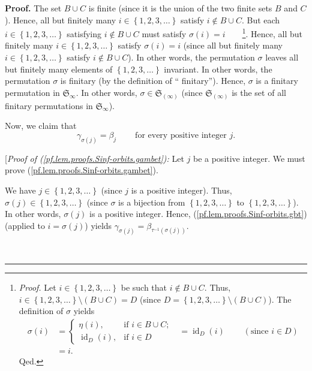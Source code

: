 \documentclass[numbers=enddot,12pt,final,onecolumn,notitlepage]{scrartcl}%
\theoremstyle{definition}
\newenvironment{proof}[1][Proof]{\noindent\textbf{#1.} }{\ \rule{0.5em}{0.5em}}
\newenvironment{verlong}{}{}
\begin{document}
\begin{verlong}
\begin{proof}
The set $B\cup C$ is finite (since it is the union of the two finite sets $B$
and $C$). Hence, all but finitely many $i\in\left\{  1,2,3,\ldots\right\}  $
satisfy $i\notin B\cup C$. But each $i\in\left\{  1,2,3,\ldots\right\}  $
satisfying $i\notin B\cup C$ must satisfy $\sigma\left(  i\right)
=i$\ \ \ \ \footnote{\textit{Proof.} Let $i\in\left\{  1,2,3,\ldots\right\}  $
be such that $i\notin B\cup C$. Thus, $i\in\left\{  1,2,3,\ldots\right\}
\setminus\left(  B\cup C\right)  =D$ (since $D=\left\{  1,2,3,\ldots\right\}
\setminus\left(  B\cup C\right)  $). The definition of $\sigma$ yields
\begin{align*}
\sigma\left(  i\right)   &  =%
\begin{cases}
\eta\left(  i\right)  , & \text{if }i\in B\cup C;\\
\operatorname*{id}\nolimits_{D}\left(  i\right)  , & \text{if }i\in D
\end{cases}
\ \ \ =\operatorname*{id}\nolimits_{D}\left(  i\right)
\ \ \ \ \ \ \ \ \ \ \left(  \text{since }i\in D\right) \\
&  =i.
\end{align*}
Qed.}. Hence, all but finitely many $i\in\left\{  1,2,3,\ldots\right\}  $
satisfy $\sigma\left(  i\right)  =i$ (since all but finitely many
$i\in\left\{  1,2,3,\ldots\right\}  $ satisfy $i\notin B\cup C$). In other
words, the permutation $\sigma$ leaves all but finitely many elements of
$\left\{  1,2,3,\ldots\right\}  $ invariant. In other words, the permutation
$\sigma$ is finitary (by the definition of \textquotedblleft
finitary\textquotedblright). Hence, $\sigma$ is a finitary permutation in
$\mathfrak{S}_{\infty}$. In other words, $\sigma\in\mathfrak{S}_{\left(
\infty\right)  }$ (since $\mathfrak{S}_{\left(  \infty\right)  }$ is the set
of all finitary permutations in $\mathfrak{S}_{\infty}$).

Now, we claim that%
\begin{equation}
\gamma_{\sigma\left(  j\right)  }=\beta_{j}\ \ \ \ \ \ \ \ \ \ \text{for every
positive integer }j. \label{pf.lem.proofs.Sinf-orbits.gambet}%
\end{equation}


[\textit{Proof of (\ref{pf.lem.proofs.Sinf-orbits.gambet}):} Let $j$ be a
positive integer. We must prove (\ref{pf.lem.proofs.Sinf-orbits.gambet}).

We have $j\in\left\{  1,2,3,\ldots\right\}  $ (since $j$ is a positive
integer). Thus, $\sigma\left(  j\right)  \in\left\{  1,2,3,\ldots\right\}  $
(since $\sigma$ is a bijection from $\left\{  1,2,3,\ldots\right\}  $ to
$\left\{  1,2,3,\ldots\right\}  $). In other words, $\sigma\left(  j\right)  $
is a positive integer. Hence, (\ref{pf.lem.proofs.Sinf-orbits.gbt}) (applied
to $i=\sigma\left(  j\right)  $) yields $\gamma_{\sigma\left(  j\right)
}=\beta_{\tau^{-1}\left(  \sigma\left(  j\right)  \right)  }$.


\end{proof}
\end{verlong}
\end{document}
